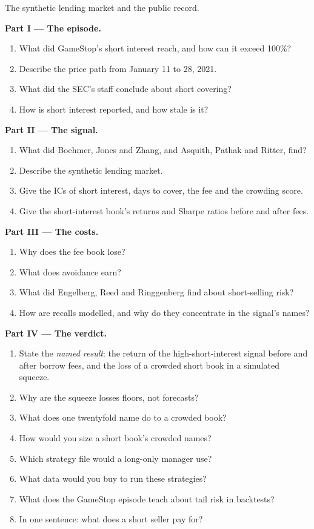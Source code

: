 \begin{problem}\label{pb:s1:short-interest-borrow-and-crowding:1}
The synthetic lending market and the public record.

\medskip\noindent\textbf{Part I --- The episode.}
\begin{enumerate}
\item What did GameStop's short interest reach, and how can it exceed 100\%?
\item Describe the price path from January 11 to 28, 2021.
\item What did the SEC's staff conclude about short covering?
\item How is short interest reported, and how stale is it?
\end{enumerate}

\medskip\noindent\textbf{Part II --- The signal.}
\begin{enumerate}[resume]
\item What did Boehmer, Jones and Zhang, and Asquith, Pathak and Ritter, find?
\item Describe the synthetic lending market.
\item Give the ICs of short interest, days to cover, the fee and the crowding score.
\item Give the short-interest book's returns and Sharpe ratios before and after fees.
\end{enumerate}

\medskip\noindent\textbf{Part III --- The costs.}
\begin{enumerate}[resume]
\item Why does the fee book lose?
\item What does avoidance earn?
\item What did Engelberg, Reed and Ringgenberg find about short-selling risk?
\item How are recalls modelled, and why do they concentrate in the signal's names?
\end{enumerate}

\medskip\noindent\textbf{Part IV --- The verdict.}
\begin{enumerate}[resume]
\item State the \emph{named result}: the return of the high-short-interest signal before and after borrow fees, and the loss of a crowded short book in a
simulated squeeze.
\item Why are the squeeze losses floors, not forecasts?
\item What does one twentyfold name do to a crowded book?
\item How would you size a short book's crowded names?
\item Which strategy file would a long-only manager use?
\item What data would you buy to run these strategies?
\item What does the GameStop episode teach about tail risk in backtests?
\item In one sentence: what does a short seller pay for?
\end{enumerate}
\end{problem}

